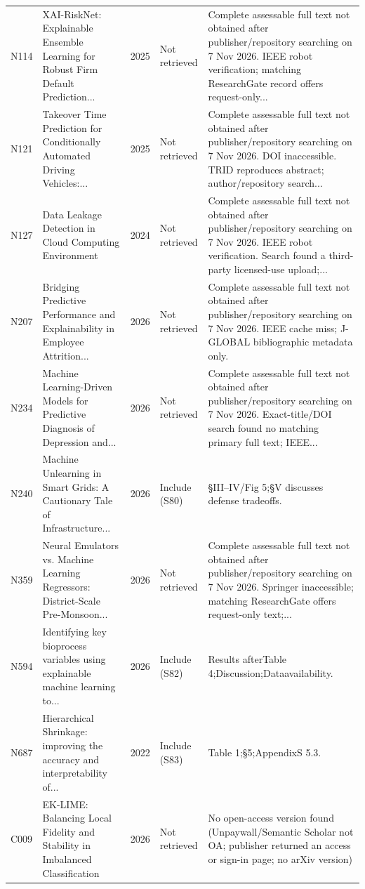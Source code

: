 \begin{longtable}{@{}P{1.0cm}P{6.3cm}P{0.7cm}P{1.6cm}P{6.1cm}@{}}
N114 & XAI-RiskNet: Explainable Ensemble Learning for Robust Firm Default Prediction... & 2025 & Not retrieved & Complete assessable full text not obtained after publisher/\allowbreak{}repository searching on 7 Nov 2026. IEEE robot verification; matching ResearchGate record offers request-only... \\
N121 & Takeover Time Prediction for Conditionally Automated Driving Vehicles:... & 2025 & Not retrieved & Complete assessable full text not obtained after publisher/\allowbreak{}repository searching on 7 Nov 2026. DOI inaccessible. TRID reproduces abstract; author/\allowbreak{}repository search... \\
N127 & Data Leakage Detection in Cloud Computing Environment & 2024 & Not retrieved & Complete assessable full text not obtained after publisher/\allowbreak{}repository searching on 7 Nov 2026. IEEE robot verification. Search found a third-party licensed-use upload;... \\
N207 & Bridging Predictive Performance and Explainability in Employee Attrition... & 2026 & Not retrieved & Complete assessable full text not obtained after publisher/\allowbreak{}repository searching on 7 Nov 2026. IEEE cache miss; J-GLOBAL bibliographic metadata only. \\
N234 & Machine Learning-Driven Models for Predictive Diagnosis of Depression and... & 2026 & Not retrieved & Complete assessable full text not obtained after publisher/\allowbreak{}repository searching on 7 Nov 2026. Exact-title/\allowbreak{}DOI search found no matching primary full text; IEEE... \\
N240 & Machine Unlearning in Smart Grids: A Cautionary Tale of Infrastructure... & 2026 & Include (S80) & §III--IV/\allowbreak{}Fig 5;§V discusses defense tradeoffs. \\
N359 & Neural Emulators vs. Machine Learning Regressors: District-Scale Pre-Monsoon... & 2026 & Not retrieved & Complete assessable full text not obtained after publisher/\allowbreak{}repository searching on 7 Nov 2026. Springer inaccessible; matching ResearchGate offers request-only text;... \\
N594 & Identifying key bioprocess variables using explainable machine learning to... & 2026 & Include (S82) & Results afterTable 4;Discussion;Dataavailability. \\
N687 & Hierarchical Shrinkage: improving the accuracy and interpretability of... & 2022 & Include (S83) & Table 1;§5;AppendixS 5.3. \\
C009 & EK-LIME: Balancing Local Fidelity and Stability in Imbalanced Classification & 2026 & Not retrieved & No open-access version found (Unpaywall/\allowbreak{}Semantic Scholar not OA; publisher returned an access or sign-in page; no arXiv version) \\

\end{longtable}
